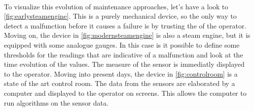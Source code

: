 \paragraph*{}
To visualize this evolution of maintenance approaches, let's have a look to \autoref{fig:earlysteamengine}. This is a purely mechanical device, so the only way to detect a malfunction before it causes a failure is by trusting the  of the operator. Moving on, the device in \autoref{fig:modernsteamengine} is also a steam engine, but it is equipped with some analogue gauges. In this case is it possible to define some thresholds for the readings that are indicative of a malfunction and look at the time evolution of the values. The measure of the sensor is immediatly displayed to the operator. Moving into present days, the device in \autoref{fig:controlroom} is a state of the art control room. The data from the sensors are elaborated by a computer and displayed to the operator on screens. This allows the computer to run algorithms on the sensor data.

